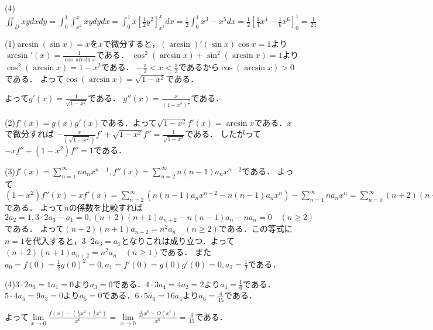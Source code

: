 \documentclass[
		book,
		head_space=20mm,
		foot_space=20mm,
		gutter=10mm,
		line_length=190mm
]{jlreq}
\begin{document}
(4)$\iint_D xydxdy=\int_0^1\int_{x^2}^xxydydx=\int_0^1 x\left[ \frac{1}{2}y^2 \right]_{x^2}^xdx=\frac{1}{2}\int_0^1 x^3-x^5dx=\frac{1}{2}\left[ \frac{1}{4}x^4-\frac{1}{6}x^6 \right]_0^1=\frac{1}{24}$

(1)$\arcsin (\sin x)=x$を$x$で微分すると，$(\arcsin)'(\sin x)\cos x=1$より$\arcsin'(x)=\frac{1}{\cos \arcsin x}$である．
$\cos^2(\arcsin x)+\sin^2 (\arcsin x)=1$より$\cos^2(\arcsin x)=1-x^2$である．
$-\frac{\pi}{2}<x<\frac{\pi}{2}$であるから$\cos (\arcsin x)>0$である．
よって$\cos (\arcsin x)=\sqrt{1-x^2}$である．

よって$g'(x)=\frac{1}{\sqrt{1-x^2}}$である．
$g''(x)=\frac{x}{(1-x^2)^{\frac{3}{2}}}$である．

(2)$f'(x)=g(x)g'(x)$である．よって$\sqrt{1-x^2}f'(x)=\arcsin x$である．$x$で微分すれば
$-\frac{x}{(\sqrt{1-x^2})}f'+\sqrt{1-x^2} f''=\frac{1}{\sqrt{1-x^2}}$である．
したがって$-xf''+(1-x^2)f''=1$である．

(3)$f'(x)=\sum\limits_{n=1}^\infty na_nx^{n-1},f''(x)=\sum\limits_{n=2}^\infty n(n-1)a_nx^{n-2}$である．
よって$(1-x^2)f''(x)-xf'(x)=\sum\limits_{n=2}^\infty (n(n-1)a_nx^{n-2}-n(n-1)a_nx^{n})-\sum\limits_{n=1}^\infty na_nx^{n}=\sum\limits_{n=0}^\infty (n+2)(n+1)a_{n+2}x^{n}-\sum\limits_{n=2}^\infty n(n-1)a_nx^{n}-\sum\limits_{n=1}^\infty na_nx^{n}=1$である．
よって$n$の係数を比較すれば$2a_2=1,3\cdot2a_3-a_1=0,(n+2)(n+1)a_{n+2}-n(n-1)a_n-na_n=0\quad(n\ge 2)$である．
よって$(n+2)(n+1)a_{n+2}=n^2a_n\quad(n\ge 2)$である．この等式に$n=1$を代入すると，$3\cdot2 a_3=a_1$となりこれは成り立つ．よって$(n+2)(n+1)a_{n+2}=n^2a_n\quad(n\ge 1)$である．
また$a_0=f(0)=\frac{1}{2}g(0)^2=0,a_1=f'(0)=g(0)g'(0)=0,a_2=\frac{1}{2}$である．

(4)$3\cdot2a_3=1a_1=0$より$a_3=0$である．$4\cdot3a_4=4a_2=2$より$a_4=\frac{1}{6}$である．
$5\cdot4a_5=9a_3=0$より$a_5=0$である．$6\cdot5a_6=16a_4$より$a_6=\frac{4}{45}$である．

よって$\lim\limits_{x\to 0}\frac{f(x)-(\frac{1}{2}x^2+\frac{1}{6}x^4)}{x^6}=\lim\limits_{x\to 0}\frac{\frac{4}{45}x^6+O(x^7)}{x^6}=\frac{4}{45}$である．
\end{document}
